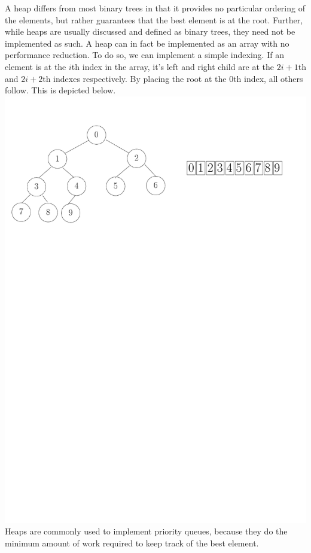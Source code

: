 A heap differs from most binary trees in that it provides no particular
ordering of the elements, but rather guarantees that the best element is
at the root. Further, while heaps are usually discussed and defined
as binary trees, they need not be implemented as such.
A heap can in fact be implemented as an array with no performance reduction.
To do so, we can implement a simple indexing. If an element is at the $i$th
index in the array, it's left and right child are at the $2i+1$th and $2i+2$th 
indexes respectively. By placing the root at the $0$th index, all others follow.
This is depicted below.
{
  \includegraphics[scale=0.5]{heapTreeArray}
  \label{fig:heapTreeArray}
}
Heaps are commonly used to implement priority queues, because they do the
minimum amount of work required to keep track of the best element.

